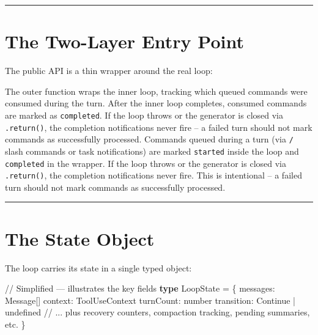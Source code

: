 \documentclass[
  english,
  11pt,
  letterpaper,
]{book}
\newenvironment{Shaded}{\begin{snugshade}}{\end{snugshade}}
\newcommand{\CommentTok}[1]{\textcolor[rgb]{0.37,0.37,0.37}{#1}}
\newcommand{\DataTypeTok}[1]{\textcolor[rgb]{0.68,0.00,0.00}{#1}}
\newcommand{\KeywordTok}[1]{\textcolor[rgb]{0.00,0.23,0.31}{\textbf{#1}}}
\newcommand{\NormalTok}[1]{\textcolor[rgb]{0.00,0.23,0.31}{#1}}
\newcommand{\OperatorTok}[1]{\textcolor[rgb]{0.37,0.37,0.37}{#1}}
\begin{document}
\begin{center}\rule{0.5\linewidth}{0.5pt}\end{center}

\section{The Two-Layer Entry Point}\label{the-two-layer-entry-point}

The public API is a thin wrapper around the real loop:

The outer function wraps the inner loop, tracking which queued commands
were consumed during the turn. After the inner loop completes, consumed
commands are marked as
\texttt{\textquotesingle{}completed\textquotesingle{}}. If the loop
throws or the generator is closed via \texttt{.return()}, the completion
notifications never fire -- a failed turn should not mark commands as
successfully processed. Commands queued during a turn (via \texttt{/}
slash commands or task notifications) are marked
\texttt{\textquotesingle{}started\textquotesingle{}} inside the loop and
\texttt{\textquotesingle{}completed\textquotesingle{}} in the wrapper.
If the loop throws or the generator is closed via \texttt{.return()},
the completion notifications never fire. This is intentional -- a failed
turn should not mark commands as successfully processed.

\begin{center}\rule{0.5\linewidth}{0.5pt}\end{center}

\section{The State Object}\label{the-state-object}

The loop carries its state in a single typed object:

\begin{Shaded}
\begin{Highlighting}[]
\CommentTok{// Simplified — illustrates the key fields}
\KeywordTok{type}\NormalTok{ LoopState }\OperatorTok{=}\NormalTok{ \{}
\NormalTok{  messages}\OperatorTok{:}\NormalTok{ Message[]}
\NormalTok{  context}\OperatorTok{:}\NormalTok{ ToolUseContext}
\NormalTok{  turnCount}\OperatorTok{:} \DataTypeTok{number}
\NormalTok{  transition}\OperatorTok{:}\NormalTok{ Continue }\OperatorTok{|} \DataTypeTok{undefined}
  \CommentTok{// ... plus recovery counters, compaction tracking, pending summaries, etc.}
\NormalTok{\}}
\end{Highlighting}
\end{Shaded}
\end{document}
